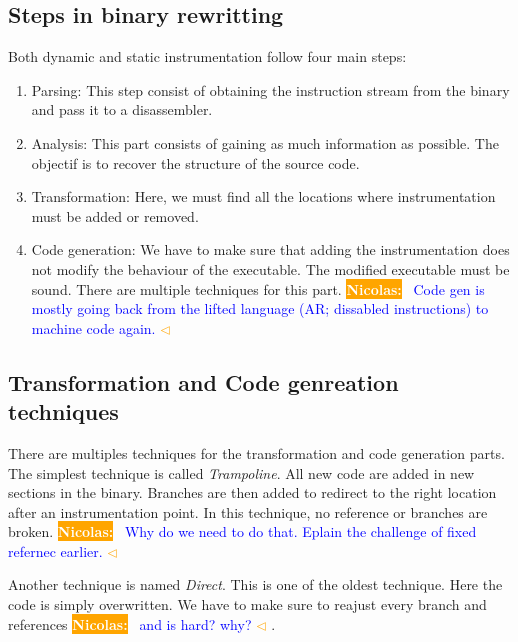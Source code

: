 \documentclass[a4paper,11pt,oneside]{report}
\newcommand{\todobox}[3]{%
    \colorbox{#1}{\textcolor{white}{\sffamily\bfseries\scriptsize #2}}%
    ~\textcolor{blue}{#3} %
    \textcolor{#1}{$\triangleleft$}%
}
\newcommand{\nb}[1]{\todobox{orange}{Nicolas:}{#1}}
\begin{document}
\subsection{Steps in binary rewritting}
Both dynamic and static instrumentation follow four main steps:
\begin{enumerate}
    \item Parsing:
        This step consist of obtaining the instruction stream from the binary
        and pass it to a disassembler.
    \item Analysis:
        This part consists of gaining as much information as possible. The
        objectif is to recover the structure of the source code.
    \item Transformation:
        Here, we must find all the locations where instrumentation must be
        added or removed. 
    \item Code generation:
        We have to make sure that adding the instrumentation does not modify the
        behaviour of the executable. The modified executable must be sound.
        There are multiple techniques for this part. \nb{Code gen is
            mostly going back from the lifted language (AR; dissabled  instructions)
        to machine code again. }
\end{enumerate}
\subsection{Transformation and Code genreation techniques}
There are multiples techniques for the transformation and code generation
parts. The simplest technique is called \textit{Trampoline}. All new code are
added in new sections in the binary. Branches are then added to redirect to the
right location after an instrumentation point. In this technique, no reference
or branches are broken. \nb{Why do we need to do that. Eplain the challenge of
fixed refernec earlier.}

Another technique is named \textit{Direct}. This is one of the oldest
technique. Here the code is simply overwritten. We have to make sure to reajust
every branch and references\nb{and is hard? why?}.
\end{document}
